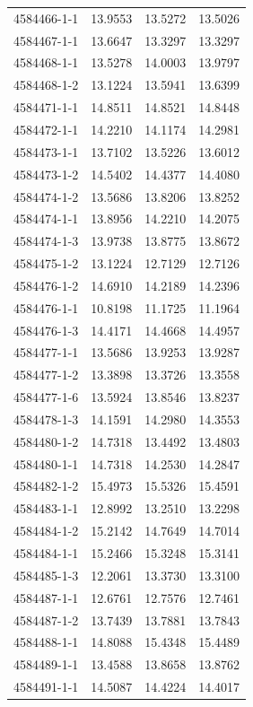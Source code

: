 \begin{longtable}{lrrr}
4584466-1-1 & 13.9553 & 13.5272 & 13.5026 \\
4584467-1-1 & 13.6647 & 13.3297 & 13.3297 \\
4584468-1-1 & 13.5278 & 14.0003 & 13.9797 \\
4584468-1-2 & 13.1224 & 13.5941 & 13.6399 \\
4584471-1-1 & 14.8511 & 14.8521 & 14.8448 \\
4584472-1-1 & 14.2210 & 14.1174 & 14.2981 \\
4584473-1-1 & 13.7102 & 13.5226 & 13.6012 \\
4584473-1-2 & 14.5402 & 14.4377 & 14.4080 \\
4584474-1-2 & 13.5686 & 13.8206 & 13.8252 \\
4584474-1-1 & 13.8956 & 14.2210 & 14.2075 \\
4584474-1-3 & 13.9738 & 13.8775 & 13.8672 \\
4584475-1-2 & 13.1224 & 12.7129 & 12.7126 \\
4584476-1-2 & 14.6910 & 14.2189 & 14.2396 \\
4584476-1-1 & 10.8198 & 11.1725 & 11.1964 \\
4584476-1-3 & 14.4171 & 14.4668 & 14.4957 \\
4584477-1-1 & 13.5686 & 13.9253 & 13.9287 \\
4584477-1-2 & 13.3898 & 13.3726 & 13.3558 \\
4584477-1-6 & 13.5924 & 13.8546 & 13.8237 \\
4584478-1-3 & 14.1591 & 14.2980 & 14.3553 \\
4584480-1-2 & 14.7318 & 13.4492 & 13.4803 \\
4584480-1-1 & 14.7318 & 14.2530 & 14.2847 \\
4584482-1-2 & 15.4973 & 15.5326 & 15.4591 \\
4584483-1-1 & 12.8992 & 13.2510 & 13.2298 \\
4584484-1-2 & 15.2142 & 14.7649 & 14.7014 \\
4584484-1-1 & 15.2466 & 15.3248 & 15.3141 \\
4584485-1-3 & 12.2061 & 13.3730 & 13.3100 \\
4584487-1-1 & 12.6761 & 12.7576 & 12.7461 \\
4584487-1-2 & 13.7439 & 13.7881 & 13.7843 \\
4584488-1-1 & 14.8088 & 15.4348 & 15.4489 \\
4584489-1-1 & 13.4588 & 13.8658 & 13.8762 \\
4584491-1-1 & 14.5087 & 14.4224 & 14.4017 \\

\end{longtable}

